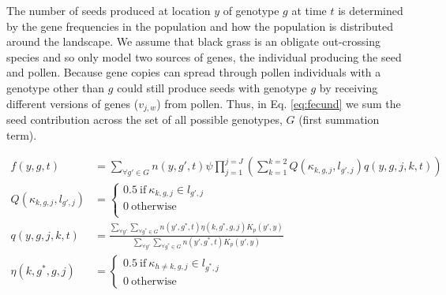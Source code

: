 \documentclass[12pt, a4paper]{article}
\begin{document}
The number of seeds produced at location $y$ of genotype $g$ at time $t$ is determined by the gene frequencies in the population and how the population is distributed around the landscape. We assume that black grass is an obligate out-crossing species and so only model two sources of genes, the individual producing the seed and pollen. Because gene copies can spread through pollen individuals with a genotype other than $g$ could still produce seeds with genotype $g$ by receiving different versions of genes ($v_{j,w}$) from pollen. Thus, in Eq. \ref{eq:fecund} we sum the seed contribution across the set of all possible genotypes, $G$ (first summation term).
     
\begin{subequations}
\label{eq:fecund_full}
\begin{align}
	\displaystyle
	\label{eq:fecund}	
	f(y, g, t) &= \sum_{\forall g' \in G} n(y, g', t) \psi \prod_{j=1}^{j=J} \left(\sum_{k=1}^{k=2} Q(\kappa_{k,g,j}, l_{g',j})q(y, g, j, k, t)\right)\\
	\label{eq:self_gene}
	Q(\kappa_{k,g,j}, l_{g',j}) &= 
		\begin{cases} 
		0.5 ~\text{if}~ \kappa_{k,g,j} \in l_{g',j}\\
		0 ~\text{otherwise}\\
		\end{cases}\\
	\label{eq:pollen_gene}
	q(y, g, j, k, t) &= \frac{\displaystyle\sum_{\forall y'} \sum_{\forall g^* \in G} n(y', g^*, t)\eta(k, g^*, g, j)K_p(y',y)}{\displaystyle \sum_{\forall y'} \sum_{\forall g^* \in G} n(y', g^*, t)K_p(y',y)}\\
	\label{eq:pollen_freq}
	\eta(k, g^*, g, j) &= 
	\begin{cases}
	0.5~\text{if}~\kappa_{h\neq k, g, j} \in l_{g^*,j} \\
	0~\text{otherwise}
	\end{cases}      
\end{align}
\end{subequations}
\end{document}
